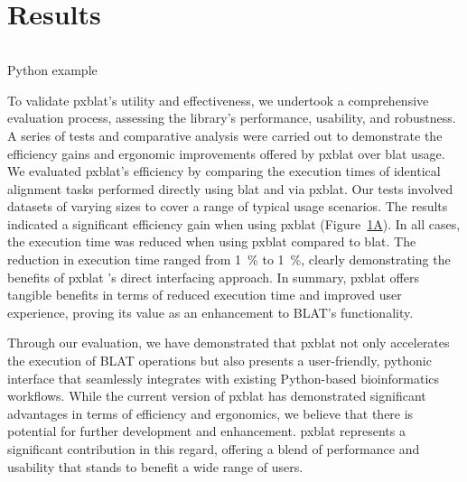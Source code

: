 \section*{Results}\label{sec:results}

\begin{listing}
	\inputminted[linenos]{python}{codes/example1.py}
	\caption{Python example}
	\label{listing:1}
\end{listing}


To validate \acrshort{pxblat}'s utility and effectiveness, we undertook a comprehensive evaluation process, assessing the library's performance, usability, and robustness.
A series of tests and comparative analysis were carried out to demonstrate the efficiency gains and ergonomic improvements offered by \acrshort{pxblat} over \acrshort{blat} usage.
We evaluated \acrshort{pxblat}'s efficiency by comparing the execution times of identical alignment tasks performed directly using \acrshort{blat}  and via \acrshort{pxblat}.
Our tests involved datasets of varying sizes to cover a range of typical usage scenarios.
The results indicated a significant efficiency gain when using \acrshort{pxblat} (Figure~\hyperref[fig:pxblat]{1A}).
In all cases, the execution time was reduced when using \acrshort{pxblat} compared to \acrshort{blat}.
The reduction in execution time ranged from \SI{1}{\percent} to \SI{1}{\percent}, clearly demonstrating the benefits of \acrshort{pxblat} 's direct interfacing approach.
In summary, \acrshort{pxblat}  offers tangible benefits in terms of reduced execution time and improved user experience, proving its value as an enhancement to BLAT's functionality.

Through our evaluation, we have demonstrated that \acrshort{pxblat} not only accelerates the execution of BLAT operations but also presents a user-friendly,
pythonic interface that seamlessly integrates with existing Python-based bioinformatics workflows.
While the current version of \acrshort{pxblat}  has demonstrated significant advantages in terms of efficiency and ergonomics, we believe that there is potential for further development and enhancement.
\acrshort{pxblat} represents a significant contribution in this regard, offering a blend of performance and usability that stands to benefit a wide range of users.





